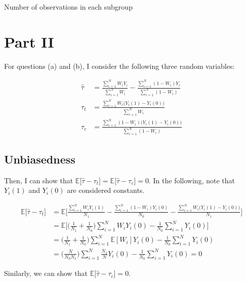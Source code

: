 \documentclass[11pt]{article}
\numberwithin{equation}{section}
\begin{document}
\begin{table}[h]
    \centering
    
    \caption{\label{tab: balance}Number of observations in each subgroup}
\end{table}



\section{Part II}

For questions (a) and (b), I consider the following three random variables:

\begin{align}
    \hat\tau &= \frac{\sum_{i=1}^N W_iY_i}{\sum_{i=1}^N W_i} - \frac{\sum_{i=1}^N (1-W_i)Y_i}{\sum_{i=1}^N (1-W_i)} \label{eq:hat_tau}\\
    \tau_t &= \frac{\sum_{i=1}^N W_i\bigl(Y_i(1) - Y_i(0)\bigr)}{\sum_{i=1}^N W_i} \label{eq:tau_t}\\
    \tau_c &= \frac{\sum_{i=1}^N (1-W_i)\bigl(Y_i(1) - Y_i(0)\bigr)}{\sum_{i=1}^N (1-W_i)} \label{eq:tau_c}
\end{align}


\subsection*{Unbiasedness}

Then, I can show that $\mathbb{E}\bigl[\hat\tau - \tau_t\bigr] = \mathbb{E}\bigl[\hat\tau - \tau_c\bigr] =0$. 
In the following, note that $Y_i(1)$ and $Y_i(0)$ are considered constants.

\begin{align*}
    \mathbb{E}\bigl[\hat\tau - \tau_t\bigr] &= \mathbb{E}\biggl[\frac{\sum_{i=1}^N W_iY_i(1)}{N_1} - \frac{\sum_{i=1}^N (1-W_i)Y_i(0)}{N_0} - \frac{\sum_{i=1}^N W_i\bigl(Y_i(1) - Y_i(0)\bigr)}{N_1}\biggr]\\
    &= \mathbb{E} \biggl[\biggl(\frac{1}{N_1} + \frac{1}{N_0}\biggr)\sum_{i=1}^N W_iY_i(0) - \frac{1}{N_0}\sum_{i=1}^NY_i(0)\biggr]\\
    &= \biggl(\frac{1}{N_1} + \frac{1}{N_0}\biggr)\sum_{i=1}^N \mathbb{E} [W_i]Y_i(0) - \frac{1}{N_0}\sum_{i=1}^NY_i(0)\\
    &= \biggl(\frac{N}{N_0N_1}\biggr)\sum_{i=1}^N \frac{N_1}{N}Y_i(0) - \frac{1}{N_0}\sum_{i=1}^NY_i(0) = 0
\end{align*}

Sinilarly, we can show that $\mathbb{E}\bigl[\hat\tau - \tau_c\bigr] = 0$.
\end{document}
